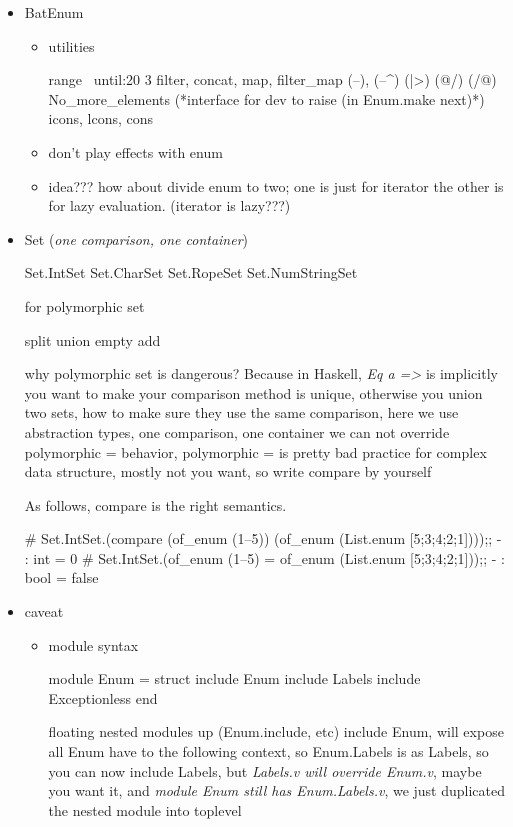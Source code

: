 
\begin{itemize}
\item BatEnum
  \begin{itemize}
  \item utilities


\begin{bluecode}
  range ~until:20 3
  filter, concat, map, filter_map
  (--), (--^) (|>) (@/) (/@)
  No_more_elements (*interface for dev to raise (in Enum.make next)*)
  icons, lcons, cons
\end{bluecode}

  \item don't play effects with enum
  \item idea??? how about divide enum to two; one is just for iterator
    the other is for lazy evaluation. (iterator is lazy???)
  \end{itemize}
\item Set (\emph{one comparison, one container})


\begin{bluecode}
Set.IntSet
Set.CharSet
Set.RopeSet
Set.NumStringSet
\end{bluecode}
for polymorphic set 

\begin{bluecode}
split
union
empty
add
\end{bluecode}
 why polymorphic set is dangerous? Because in Haskell, \textit{Eq a =>} is implicitly
 you want to make your comparison method is unique, otherwise you
 union two sets, how to make sure they use the same comparison, here
 we use abstraction types, one comparison, one container
 we can not override polymorphic = behavior, polymorphic = is pretty bad practice
 for complex data structure, mostly not you want, so write compare by yourself

As follows, compare is the right semantics.
\begin{alternate}
# Set.IntSet.(compare (of_enum (1--5))  (of_enum (List.enum [5;3;4;2;1])));;
- : int = 0
# Set.IntSet.(of_enum (1--5) = of_enum (List.enum [5;3;4;2;1]));;
- : bool = false
\end{alternate}


\item caveat
  \begin{itemize}
  \item module syntax

 \begin{bluecode}
module Enum = struct
  include Enum include Labels include Exceptionless
end
\end{bluecode}


    floating nested modules up (Enum.include, etc)
    include Enum, will expose all Enum have to the following context, so Enum.Labels
    is as Labels, so you can now include Labels, but \emph{Labels.v will override Enum.v},
    maybe you want it, and \emph{module Enum still has Enum.Labels.v}, we just duplicated
    the nested module into toplevel
  \end{itemize}
\end{itemize}

